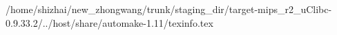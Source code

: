 /home/shizhai/new_zhongwang/trunk/staging_dir/target-mips_r2_uClibc-0.9.33.2/../host/share/automake-1.11/texinfo.tex